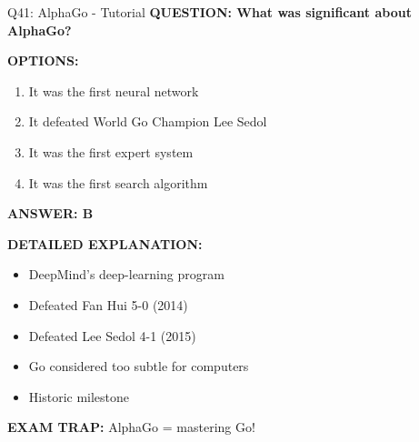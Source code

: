 \documentclass[8pt]{beamer}
\begin{document}
	\begin{frame}{Q41: AlphaGo - Tutorial}
		\fontsize{6.5}{7.5}\selectfont
		\textbf{QUESTION: What was significant about AlphaGo?}
		
		\vspace{0.1cm}
		\textbf{OPTIONS:}
		\begin{enumerate}
			\item It was the first neural network
			\item It defeated World Go Champion Lee Sedol
			\item It was the first expert system
			\item It was the first search algorithm
		\end{enumerate}
		
		\vspace{0.1cm}
		\textcolor{myblue}{\textbf{ANSWER: B}}
		
		\vspace{0.1cm}
		\textbf{DETAILED EXPLANATION:}
		\begin{itemize}
			\item DeepMind's deep-learning program
			\item Defeated Fan Hui 5-0 (2014)
			\item Defeated Lee Sedol 4-1 (2015)
			\item Go considered too subtle for computers
			\item Historic milestone
		\end{itemize}
		
		\vspace{0.1cm}
		\textcolor{myred}{\textbf{EXAM TRAP:}} AlphaGo = \textcolor{myblue}{mastering Go}!
	\end{frame}
	
\end{document}
